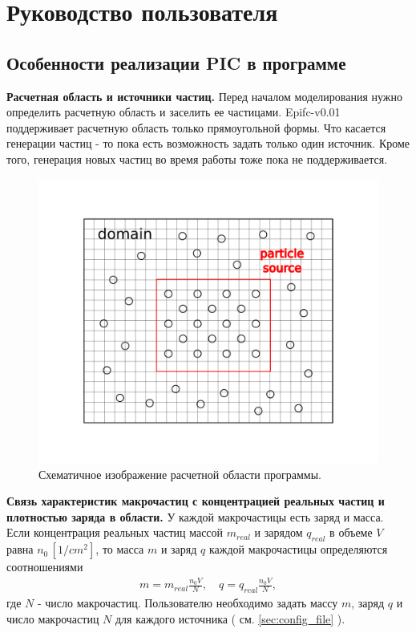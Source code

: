 \section{Руководство пользователя}

\subsection{ Особенности реализации PIC в программе \prognv }

\textbf{Расчетная область и источники частиц.}
Перед началом моделирования нужно определить расчетную область и заселить ее частицами.
Epifc-v0.01 поддерживает расчетную область только прямоугольной формы. 
Что касается генерации частиц - то пока есть возможность задать только один источник.
Кроме того, генерация новых частиц во время работы тоже пока не поддерживается.
\begin{figure}[h]
  \centering
  \includegraphics[scale=0.8]{./figs/domain.png}
  \caption{
    Схематичное изображение расчетной области программы.
  }
\end{figure}



\textbf{Связь характеристик макрочастиц с концентрацией реальных частиц и плотностью заряда в области.}
У каждой макрочастицы есть заряд и масса. 
Если концентрация реальных частиц
массой $m_{real}$ и зарядом $q_{real}$
в объеме $V$ равна $n_0\, [1/cm^2]$, 
то масса $m$ и заряд $q$ каждой макрочастицы определяются соотношениями
\begin{gather}
  m = m_{real} \frac{ n_0 V }{ N },
  \quad
  q = q_{real} \frac{ n_0 V }{ N },
\end{gather}
где $N$ - число макрочастиц.
Пользователю необходимо задать массу $m$, заряд $q$ и число макрочастиц $N$
для каждого источника ( см. \ref{sec:config_file} ).

